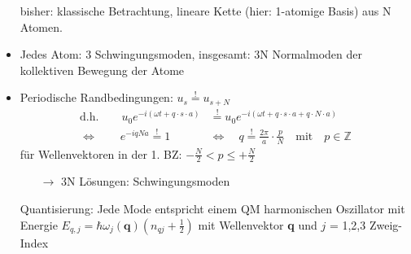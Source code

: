 \begin{itemize}
	\item[bisher:] klassische Betrachtung, lineare Kette (hier: 1-atomige Basis) aus N Atomen.
	\item Jedes Atom: 3 Schwingungsmoden, insgesamt: 3N Normalmoden der kollektiven Bewegung der Atome
	\item Periodische Randbedingungen: $u_s \overset{!}{=} u_{s+N}$
	\begin{align*}
		\text{d.h.} \qquad u_0 e^{-i(\omega t + q \cdot s \cdot a)} &\overset{!}{=} u_0 e^{-i(\omega t + q \cdot s \cdot a + q \cdot N \cdot a)}\\
		\Leftrightarrow \qquad e^{-iqNa} \overset{!}{=} 1 \quad &\Leftrightarrow \quad q \overset{!}{=} \frac{2 \pi}{a} \cdot \frac{p}{N} \quad \text{mit} \quad p \in \mathbb{Z}
	\end{align*}
	für Wellenvektoren in der 1. BZ: $-\frac{N}{2} < p \leq + \frac{N}{2}$
	\begin{itemize}
		\item[$\rightarrow$] 3N Lösungen: Schwingungsmoden
	\end{itemize}
	Quantisierung: Jede Mode entspricht einem QM harmonischen Oszillator mit Energie $E_{q,j} = \hbar \omega_j(\textbf{q})(n_{qj} + \frac{1}{2})$ mit Wellenvektor \textbf{q} und $j$ = 1,2,3 Zweig-Index
\end{itemize}
